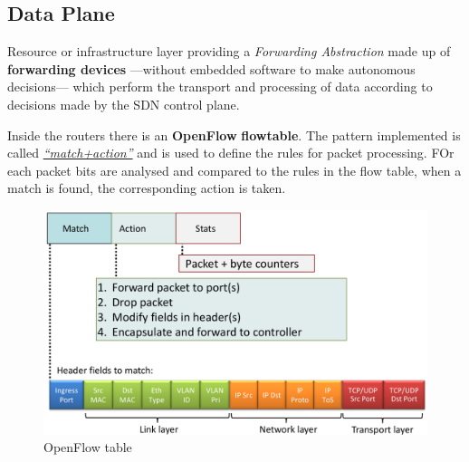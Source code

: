 \newpage
\subsection{Data Plane}
Resource or infrastructure layer providing a \textit{Forwarding Abstraction} made up of \textbf{forwarding devices} ---without embedded software to make autonomous decisions--- which perform the transport and processing of data according to decisions made by the SDN control plane.

\begin{paracol}{2}
   
   Inside the routers there is an \textbf{OpenFlow} \textbf{flow\footnotemark[1] table}.
   The pattern implemented is called \ul{\textit{``match+action''}} and is used to define the rules for packet processing. FOr each packet bits are analysed and compared to the rules in the flow table, when a match is found, the corresponding action is taken.
   \switchcolumn
   \begin{figure}[htbp]
   \centering
   \includegraphics{images/openflow_table.png}
   \caption{OpenFlow table}
   \label{fig:openflow_table}
   \end{figure}
\end{paracol}

